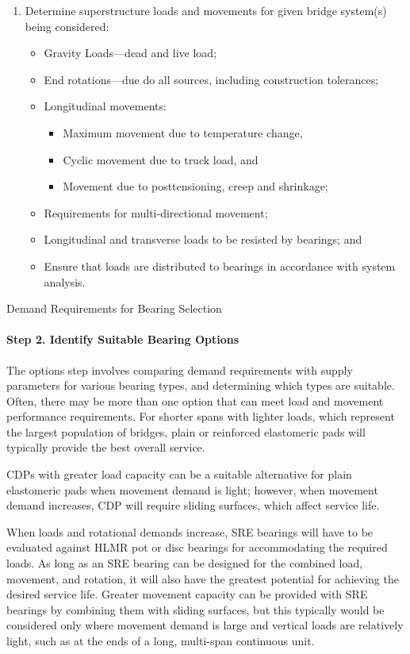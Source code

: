\begin{enumerate}[label=步骤 1.\arabic*,itemindent=4em]
  \item Determine superstructure loads and movements for given bridge system(s) being considered:
  \begin{itemize}
    \item Gravity Loads—dead and live load;
    \item End rotations—due do all sources, including construction tolerances;
    \item Longitudinal movements:
    \begin{itemize}
      \item Maximum movement due to temperature change,
      \item Cyclic movement due to truck load, and
      \item Movement due to posttensioning, creep and shrinkage;
    \end{itemize}
    \item Requirements for multi-directional movement;
    \item Longitudinal and transverse loads to be resisted by bearings; and
    \item Ensure that loads are distributed to bearings in accordance with system analysis.
  \end{itemize}
\end{enumerate}

\begin{table}
  \caption{Demand Requirements for Bearing Selection}
  \label{tab:requirements-bearing-selection}
\end{table}


\paragraph*{Step 2. Identify Suitable Bearing Options}
The options step involves comparing demand requirements with supply parameters for various bearing types,
and determining which types are suitable. Often, there may be more than one option that can meet load and
movement performance requirements. For shorter spans with lighter loads, which represent the largest population
of bridges, plain or reinforced elastomeric pads will typically provide the best overall service.

CDPs with greater load capacity can be a suitable alternative for plain elastomeric pads when movement
demand is light; however, when movement demand increases, CDP will require sliding surfaces, which affect
service life.

When loads and rotational demands increase, SRE bearings will have to be evaluated against HLMR pot or disc bearings for accommodating the required loads. As long as an SRE bearing can be designed for the combined load, movement, and rotation, it will also have the greatest potential for achieving the desired service life. Greater movement capacity can be provided with SRE bearings by combining them with sliding surfaces, but this typically would be considered only where movement demand is large and vertical loads are relatively light, such as at the ends of a long, multi-span continuous unit.

